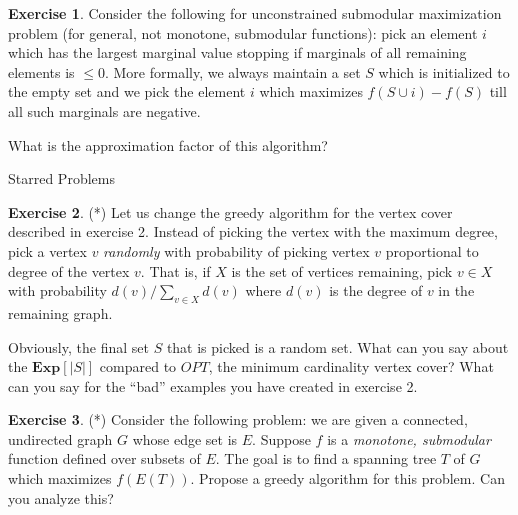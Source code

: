 \documentclass[11pt]{article}
\theoremstyle{definition}
\newtheorem{exercise}{Exercise}
\begin{document}
\begin{exercise}
Consider the following for unconstrained submodular maximization problem (for general, not monotone, submodular functions): pick an element $i$ which has the largest marginal value stopping if marginals of all remaining elements is $\leq 0$. More formally, we always maintain a set $S$ which is initialized to the empty set and we pick the element $i$ which maximizes $f(S\cup i) - f(S)$ till all such marginals are negative. 

What is the approximation factor of this algorithm?
\end{exercise}
\vspace{1ex}
\begin{center}
Starred Problems
\end{center}

\begin{exercise}(*)
Let us change the greedy algorithm for the vertex cover described in exercise 2. 
Instead of picking the vertex with the maximum degree, pick a vertex $v$ {\em randomly} with probability of picking vertex $v$ proportional to degree of the vertex $v$.
That is, if $X$ is the set of vertices remaining, pick $v\in X$ with probability $d(v)/\sum_{v\in X} d(v)$ where $d(v)$ is the degree of $v$ in the remaining graph.

Obviously, the final set $S$ that is picked is a random set. What can you say about the $\mathbf{Exp}[|S|]$ compared to $OPT$, the minimum cardinality vertex cover?
What can you say for the ``bad'' examples you have created in exercise 2.
\end{exercise}

\begin{exercise}(*)
Consider the following problem: we are given a connected, undirected graph $G$ whose edge set is $E$. Suppose $f$ is a {\em monotone, submodular} function defined over subsets of $E$. The goal is to find a spanning tree $T$ of $G$ which maximizes $f(E(T))$. Propose a greedy algorithm for this problem. Can you analyze this?
\end{exercise}
\end{document}
